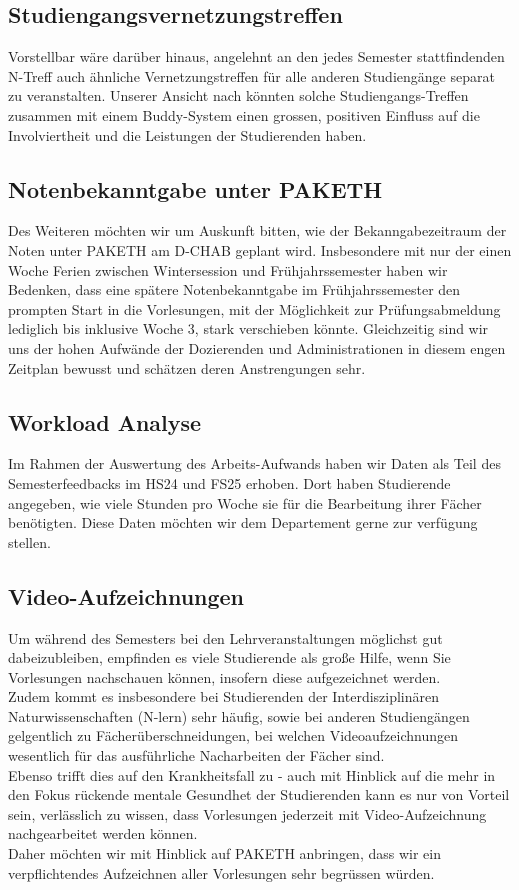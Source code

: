 \documentclass{article}
\begin{document}
\subsection{Studiengangsvernetzungstreffen}
Vorstellbar wäre darüber hinaus, angelehnt an den jedes Semester stattfindenden N-Treff auch ähnliche Vernetzungstreffen für alle anderen Studiengänge separat zu veranstalten. Unserer Ansicht nach könnten solche Studiengangs-Treffen zusammen mit einem Buddy-System einen grossen, positiven Einfluss auf die Involviertheit und die Leistungen der Studierenden haben.

\subsection{Notenbekanntgabe unter PAKETH}
Des Weiteren möchten wir um Auskunft bitten, wie der Bekanngabezeitraum der Noten unter PAKETH am D-CHAB geplant wird. Insbesondere mit nur der einen Woche Ferien zwischen Wintersession und Frühjahrssemester haben wir Bedenken, dass eine spätere Notenbekanntgabe im Frühjahrssemester den prompten Start in die Vorlesungen, mit der Möglichkeit zur Prüfungsabmeldung lediglich bis inklusive Woche 3, stark verschieben könnte. Gleichzeitig sind wir uns der hohen Aufwände der Dozierenden und Administrationen in diesem engen Zeitplan bewusst und schätzen deren Anstrengungen sehr.

\subsection{Workload Analyse}
Im Rahmen der Auswertung des Arbeits-Aufwands haben wir Daten als Teil des Semesterfeedbacks im HS24 und FS25 erhoben. Dort haben Studierende angegeben, wie viele Stunden pro Woche sie für die Bearbeitung ihrer Fächer benötigten. Diese Daten möchten wir dem Departement gerne zur verfügung stellen.

\subsection{Video-Aufzeichnungen}
Um während des Semesters bei den Lehrveranstaltungen möglichst gut dabeizubleiben, empfinden es viele Studierende als große Hilfe, wenn Sie Vorlesungen nachschauen können, insofern diese aufgezeichnet werden.\\
Zudem kommt es insbesondere bei Studierenden der Interdisziplinären Naturwissenschaften (N-lern) sehr häufig, sowie bei anderen Studiengängen gelgentlich zu Fächerüberschneidungen, bei welchen Videoaufzeichnungen wesentlich für das ausführliche Nacharbeiten der Fächer sind.\\ 
Ebenso trifft dies auf den Krankheitsfall zu - auch mit Hinblick auf die mehr in den Fokus rückende mentale Gesundhet der Studierenden kann es nur von Vorteil sein, verlässlich zu wissen, dass Vorlesungen jederzeit mit Video-Aufzeichnung nachgearbeitet werden können. \\ 
Daher möchten wir mit Hinblick auf PAKETH anbringen, dass wir ein verpflichtendes Aufzeichnen aller Vorlesungen sehr begrüssen würden. \\
\end{document}
